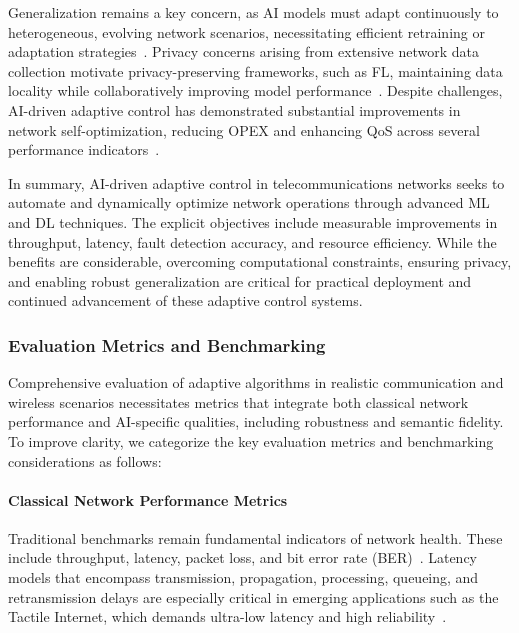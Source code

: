 \documentclass[sigconf]{acmart}
\begin{document}
Generalization remains a key concern, as AI models must adapt continuously to heterogeneous, evolving network scenarios, necessitating efficient retraining or adaptation strategies~\cite{ref7}. Privacy concerns arising from extensive network data collection motivate privacy-preserving frameworks, such as FL, maintaining data locality while collaboratively improving model performance~\cite{ref10,ref11}. Despite challenges, AI-driven adaptive control has demonstrated substantial improvements in network self-optimization, reducing OPEX and enhancing QoS across several performance indicators~\cite{ref14,ref50}.

In summary, AI-driven adaptive control in telecommunications networks seeks to automate and dynamically optimize network operations through advanced ML and DL techniques. The explicit objectives include measurable improvements in throughput, latency, fault detection accuracy, and resource efficiency. While the benefits are considerable, overcoming computational constraints, ensuring privacy, and enabling robust generalization are critical for practical deployment and continued advancement of these adaptive control systems.

\subsubsection{Evaluation Metrics and Benchmarking}

Comprehensive evaluation of adaptive algorithms in realistic communication and wireless scenarios necessitates metrics that integrate both classical network performance and AI-specific qualities, including robustness and semantic fidelity. To improve clarity, we categorize the key evaluation metrics and benchmarking considerations as follows:

\paragraph{Classical Network Performance Metrics} Traditional benchmarks remain fundamental indicators of network health. These include throughput, latency, packet loss, and bit error rate (BER)~\cite{ref3,ref5}. Latency models that encompass transmission, propagation, processing, queueing, and retransmission delays are especially critical in emerging applications such as the Tactile Internet, which demands ultra-low latency and high reliability~\cite{ref10}.
\end{document}
